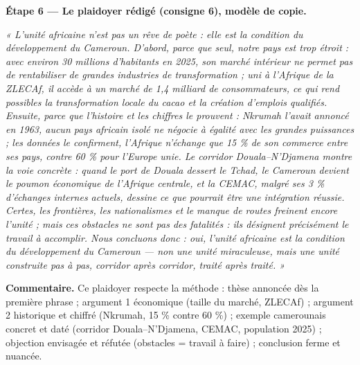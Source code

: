 \documentclass[11pt]{article}
\newcounter{popsec}
\newcounter{popsub}
\newcommand{\courssub}[1]{%
  \stepcounter{popsub}%
  \par\vspace{9pt}\noindent{\popxbold\fontsize{11.5}{13}\selectfont\color{popink}{\color{poporange}\thepopsec.\thepopsub}\hspace{6pt}#1}\par\nopagebreak\vspace{4pt}
}
\begin{document}
\begin{exoresolu}
\textbf{Étape 6 — Le plaidoyer rédigé (consigne 6), modèle de copie.}

\emph{« L'unité africaine n'est pas un rêve de poète : elle est la condition du développement du Cameroun. D'abord, parce que seul, notre pays est trop étroit : avec environ 30 millions d'habitants en 2025, son marché intérieur ne permet pas de rentabiliser de grandes industries de transformation ; uni à l'Afrique de la ZLECAf, il accède à un marché de 1,4 milliard de consommateurs, ce qui rend possibles la transformation locale du cacao et la création d'emplois qualifiés. Ensuite, parce que l'histoire et les chiffres le prouvent : Nkrumah l'avait annoncé en 1963, aucun pays africain isolé ne négocie à égalité avec les grandes puissances ; les données le confirment, l'Afrique n'échange que 15 \% de son commerce entre ses pays, contre 60 \% pour l'Europe unie. Le corridor Douala--N'Djamena montre la voie concrète : quand le port de Douala dessert le Tchad, le Cameroun devient le poumon économique de l'Afrique centrale, et la CEMAC, malgré ses 3 \% d'échanges internes actuels, dessine ce que pourrait être une intégration réussie. Certes, les frontières, les nationalismes et le manque de routes freinent encore l'unité ; mais ces obstacles ne sont pas des fatalités : ils désignent précisément le travail à accomplir. Nous concluons donc : oui, l'unité africaine est la condition du développement du Cameroun — non une unité miraculeuse, mais une unité construite pas à pas, corridor après corridor, traité après traité. »}

\textbf{Commentaire.} Ce plaidoyer respecte la méthode : thèse annoncée dès la première phrase ; argument 1 économique (taille du marché, ZLECAf) ; argument 2 historique et chiffré (Nkrumah, 15 \% contre 60 \%) ; exemple camerounais concret et daté (corridor Douala--N'Djamena, CEMAC, population 2025) ; objection envisagée et réfutée (obstacles = travail à faire) ; conclusion ferme et nuancée.
\end{exoresolu}

\courssub{Bilan de l'activité}
\end{document}
